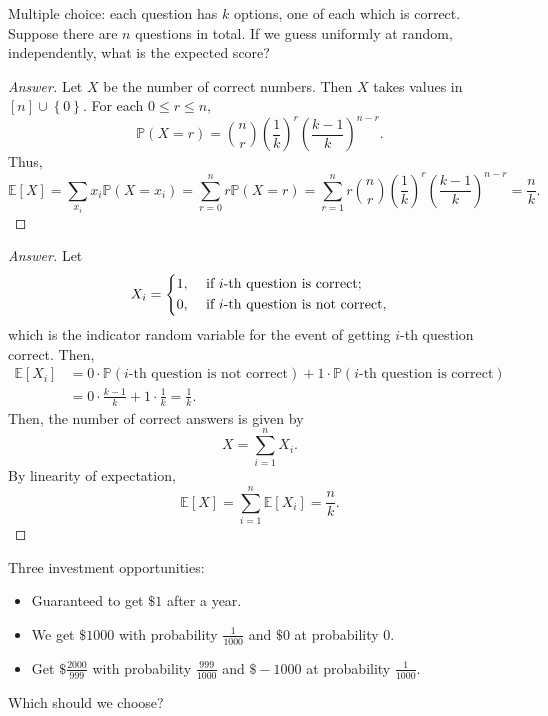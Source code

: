 \begin{eg}
    Multiple choice: each question has \(k\) options, one of each which is correct. Suppose there are \(n\) questions in total. If we guess uniformly at random, independently, what is the expected score?  
\end{eg}

\begin{proof}[Answer]      
    Let \(X\) be the number of correct numbers. Then \(X\) takes values in \([n] \cup \left\{ 0 \right\} \). For each \(0 \le r \le n\), 
    \[
        \mathbb{P} (X = r) = \binom{n}{r} \left( \frac{1}{k} \right)^r \left( \frac{k-1}{k} \right)^{n-r}.  
    \]
    Thus, 
    \[
        \mathbb{E} [X] = \sum_{x_i} x_i \mathbb{P} (X = x_i) = \sum_{r = 0}^n r \mathbb{P} (X = r) = \sum_{r = 1}^n r \binom{n}{r} \left( \frac{1}{k} \right)^r \left( \frac{k-1}{k} \right)^{n-r} = \frac{n}{k}.   
    \]    
\end{proof}        

\begin{proof}[Answer]
    Let 
    \[
        X_i = \begin{dcases}
            1, &\text{ if } i \text{-th question is correct}  ;\\
            0, &\text{ if } i \text{-th question is not correct} ,
        \end{dcases}
    \]
    which is the indicator random variable for the event of getting \(i\)-th question correct. Then,
    \begin{align*}
        \mathbb{E} [X_i] &= 0 \cdot \mathbb{P} (i\text{-th question is not correct} ) + 1 \cdot \mathbb{P} (i\text{-th question is correct} ) \\
        &= 0 \cdot \frac{k-1}{k} + 1 \cdot \frac{1}{k} = \frac{1}{k}.
    \end{align*}
    Then, the number of correct answers is given by 
    \[
        X = \sum_{i=1}^n X_i. 
    \]
    By linearity of expectation,
    \[
        \mathbb{E} [X] = \sum_{i=1}^n \mathbb{E} [X_i] = \frac{n}{k}. 
    \]
\end{proof}

\begin{question}
    Three investment opportunities: 
    \begin{itemize}
        \item [1.] Guaranteed to get \(\$ 1\) after a year. 
        \item [2.] We get \(\$ 1000\) with probability \(\frac{1}{1000}\) and \(\$ 0\) at probability \(0\). 
        \item [3.] Get \(\$ \frac{2000}{999}\) with probability \(\frac{999}{1000}\) and \(\$ -1000\) at probability \(\frac{1}{1000}\).        
    \end{itemize}
    Which should we choose?
\end{question}